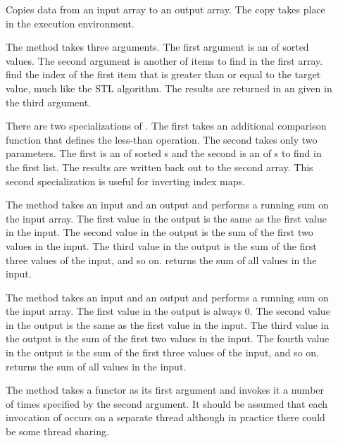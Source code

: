 \begin{description}
\item[]  Copies data from an input array to an
  output array. The copy takes place in the execution environment.
\item[]  The
   method takes three arguments. The first argument
  is an  of sorted values. The second argument
  is another  of items to find in the first
  array.  find the index of the first item that is
  greater than or equal to the target value, much like the
   STL algorithm. The results are returned in
  an  given in the third argument.

  There are two specializations of . The first takes
  an additional comparison function that defines the less-than
  operation. The second takes only two parameters. The first is an
   of sorted s and the second is an
   of s to find in the first list. The
  results are written back out to the second array. This second
  specialization is useful for inverting index maps.
\item[]  The
   method takes an input and an output
   and performs a running sum on the input
  array. The first value in the output is the same as the first value in
  the input. The second value in the output is the sum of the first two
  values in the input. The third value in the output is the sum of the
  first three values of the input, and so on. 
  returns the sum of all values in the input.
\item[]  The
   method takes an input and an output
   and performs a running sum on the input
  array. The first value in the output is always 0. The second value in the
  output is the same as the first value in the input. The third value in
  the output is the sum of the first two values in the input. The fourth
  value in the output is the sum of the first three values of the input,
  and so on.  returns the sum of all values in the
  input.
\item[]  The  method
  takes a functor as its first argument and invokes it a number of times
  specified by the second argument. It should be assumed that each
  invocation of  occurs on a separate thread although in
  practice there could be some thread sharing.


\end{description}
